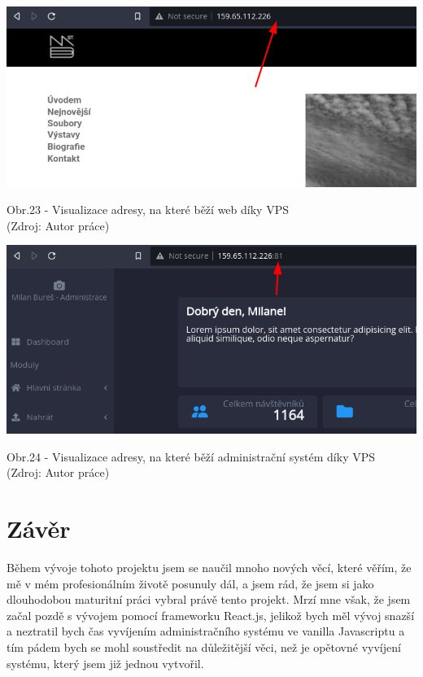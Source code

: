 \documentclass[12pt,a4paper]{report}
\begin{document}
  \vspace*{0.5cm}
  \noindent\includegraphics[width=\linewidth]{VPS_WEB.png}
  \begin{center}
    Obr.23 - Visualizace adresy, na které běží web díky VPS \\
    (Zdroj: Autor práce)
  \end{center}
  \vspace*{0.5cm}
  \vspace*{0.5cm}
  \noindent\includegraphics[width=\linewidth]{VPS_CMS.png}
  \begin{center}
    Obr.24 - Visualizace adresy, na které běží administrační systém díky VPS \\
    (Zdroj: Autor práce)
  \end{center}
  \vspace*{0.5cm}

  \clearpage
  \section*{Závěr}
  Během vývoje tohoto projektu jsem se naučil mnoho nových věcí, které věřím, že mě v mém
  profesionálním životě posunuly dál, a jsem rád, že jsem si jako dlouhodobou maturitní práci
  vybral právě tento projekt. Mrzí mne však, že jsem začal pozdě s vývojem pomocí frameworku
  React.js, jelikož bych měl vývoj snazší a neztratil bych čas vyvíjením administračního systému ve
  vanilla Javascriptu a tím pádem bych se mohl soustředit na důležitější věci, než je opětovné
  vyvíjení systému, který jsem již jednou vytvořil.
\end{document}
